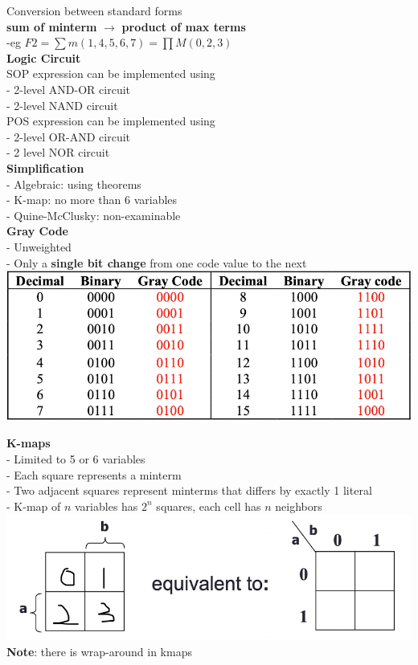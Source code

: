 \documentclass[10pt, a4paper]{article}
\newcommand{\highlight}[1]{{\color{red}\textbf{#1}}}
\begin{document}
\begin{multicols*}{3}
		Conversion between standard forms\\
		\textbf{sum of minterm} $\rightarrow$ \textbf{product of max terms}\\
		-eg $F2 = \sum m(1,4,5,6,7) = \prod M(0,2,3)$\\
		
		{\normalsize\textbf{Logic Circuit}}\\
		SOP expression can be implemented using\\
		- 2-level AND-OR circuit\\
		- 2-level NAND circuit\\
		
		POS expression can be implemented using\\
		- 2-level OR-AND circuit\\
		- 2 level NOR circuit\\
		
		{\normalsize\textbf{Simplification}}\\
		- Algebraic: using theorems\\
		- K-map: no more than 6 variables\\
		- Quine-McClusky: non-examinable\\
		
		\textbf{Gray Code}\\
		- Unweighted\\
		- Only a \textbf{single bit change} from one code value to the next\\
		\includegraphics[scale=.4]{./assets/grayCode}
		
		\textbf{K-maps}\\
		- Limited to 5 or 6 variables\\
		- Each square represents a minterm\\
		- Two adjacent squares represent minterms that differs by exactly 1 literal\\
		- K-map of $n$ variables has $2^n$ squares, each cell has $n$ neighbors\\
		\includegraphics[scale=.3]{./assets/2VarKMap}\\
		\highlight{Note}: there is wrap-around in kmaps\\
		

\end{multicols*}
\end{document}
